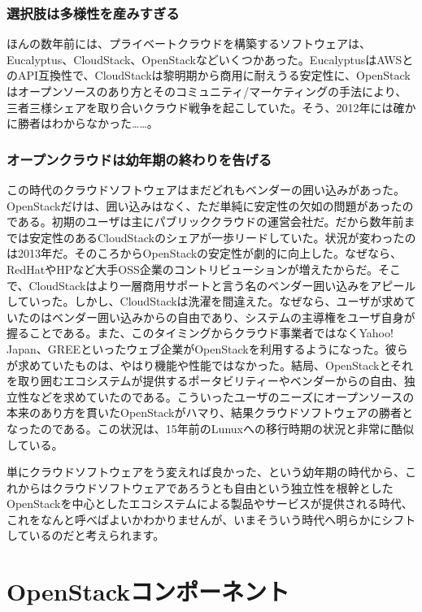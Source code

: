 \documentclass[8pt,b5paper,tombo,openany]{jsbook}
\begin{document}
\subsubsection{選択肢は多様性を産みすぎる}

ほんの数年前には、プライベートクラウドを構築するソフトウェアは、Eucalyptus、CloudStack、OpenStackなどいくつかあった。EucalyptusはAWSとのAPI互換性で、CloudStackは黎明期から商用に耐えうる安定性に、OpenStackはオープンソースのあり方とそのコミュニティ/マーケティングの手法により、三者三様シェアを取り合いクラウド戦争を起こしていた。そう、2012年には確かに勝者はわからなかった……。

\subsubsection{オープンクラウドは幼年期の終わりを告げる}

この時代のクラウドソフトウェアはまだどれもベンダーの囲い込みがあった。OpenStackだけは、囲い込みはなく、ただ単純に安定性の欠如の問題があったのである。初期のユーザは主にパブリッククラウドの運営会社だ。だから数年前までは安定性のあるCloudStackのシェアが一歩リードしていた。状況が変わったのは2013年だ。そのころからOpenStackの安定性が劇的に向上した。なぜなら、RedHatやHPなど大手OSS企業のコントリビューションが増えたからだ。そこで、CloudStackはより一層商用サポートと言う名のベンダー囲い込みをアピールしていった。しかし、CloudStackは洗濯を間違えた。なぜなら、ユーザが求めていたのはベンダー囲い込みからの自由であり、システムの主導権をユーザ自身が握ることである。また、このタイミングからクラウド事業者ではなくYahoo! Japan、GREEといったウェブ企業がOpenStackを利用するようになった。彼らが求めていたものは、やはり機能や性能ではなかった。結局、OpenStackとそれを取り囲むエコシステムが提供するポータビリティーやベンダーからの自由、独立性などを求めていたのである。こういったユーザのニーズにオープンソースの本来のあり方を貫いたOpenStackがハマり、結果クラウドソフトウェアの勝者となったのである。この状況は、15年前のLunuxへの移行時期の状況と非常に酷似している。

単にクラウドソフトウェアをう変えれば良かった、という幼年期の時代から、これからはクラウドソフトウェアであろうとも自由という独立性を根幹としたOpenStackを中心としたエコシステムによる製品やサービスが提供される時代、これをなんと呼べばよいかわかりませんが、いまそういう時代へ明らかにシフトしているのだと考えられます。

\section{OpenStackコンポーネント}
\end{document}
